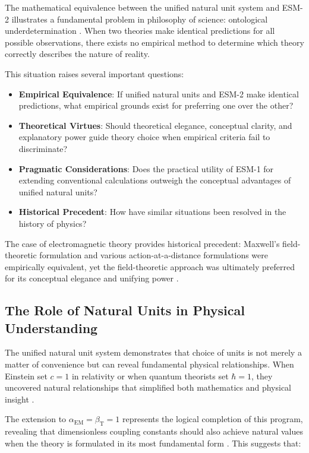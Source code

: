 \documentclass[12pt,a4paper]{article}
\newcommand{\alphaEM}{\alpha_{\text{EM}}}
\newcommand{\betaT}{\beta_{\text{T}}}
\begin{document}
	The mathematical equivalence between the unified natural unit system and ESM-2 illustrates a fundamental problem in philosophy of science: ontological underdetermination \cite{Duhem1906,Quine1951}. When two theories make identical predictions for all possible observations, there exists no empirical method to determine which theory correctly describes the nature of reality.
	
	This situation raises several important questions:
	
	\begin{itemize}
		\item \textbf{Empirical Equivalence}: If unified natural units and ESM-2 make identical predictions, what empirical grounds exist for preferring one over the other?
		\item \textbf{Theoretical Virtues}: Should theoretical elegance, conceptual clarity, and explanatory power guide theory choice when empirical criteria fail to discriminate? \cite{Kuhn1977}
		\item \textbf{Pragmatic Considerations}: Does the practical utility of ESM-1 for extending conventional calculations outweigh the conceptual advantages of unified natural units?
		\item \textbf{Historical Precedent}: How have similar situations been resolved in the history of physics? \cite{Poincare1905}
	\end{itemize}
	
	The case of electromagnetic theory provides historical precedent: Maxwell's field-theoretic formulation and various action-at-a-distance formulations were empirically equivalent, yet the field-theoretic approach was ultimately preferred for its conceptual elegance and unifying power \cite{Maxwell1873}.
	
	\subsection{The Role of Natural Units in Physical Understanding}
	\label{subsec:natural_units_understanding}
	
	The unified natural unit system demonstrates that choice of units is not merely a matter of convenience but can reveal fundamental physical relationships. When Einstein set $c = 1$ in relativity or when quantum theorists set $\hbar = 1$, they uncovered natural relationships that simplified both mathematics and physical insight \cite{Einstein1905,Dirac1927}.
	
	The extension to $\alphaEM = \betaT = 1$ represents the logical completion of this program, revealing that dimensionless coupling constants should also achieve natural values when the theory is formulated in its most fundamental form \cite{pascher_unified_2025}. This suggests that:
	
\end{document}
